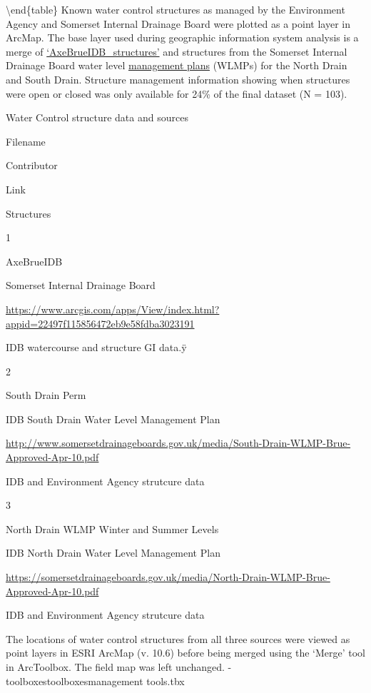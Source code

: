\documentclass[]{article}
\begin{document}
\textbackslash{}end\{table\} Known water control structures as managed
by the Environment Agency and Somerset Internal Drainage Board were
plotted as a point layer in ArcMap. The base layer used during
geographic information system analysis is a merge of
\href{https://www.arcgis.com/apps/View/index.html?appid=22497f115856472eb9e58fdba3023191}{`AxeBrueIDB\_structures'}
and structures from the Somerset Internal Drainage Board water level
\href{http://somersetdrainageboards.gov.uk/environment/wlmps/}{management
plans} (WLMPs) for the North Drain and South Drain. Structure management
information showing when structures were open or closed was only
available for 24\% of the final dataset (N = 103).

Water Control structure data and sources

Filename

Contributor

Link

Structures

1

AxeBrueIDB

Somerset Internal Drainage Board

\url{https://www.arcgis.com/apps/View/index.html?appid=22497f115856472eb9e58fdba3023191}

IDB watercourse and structure GI data.ÿ

2

South Drain Perm

IDB South Drain Water Level Management Plan

\url{http://www.somersetdrainageboards.gov.uk/media/South-Drain-WLMP-Brue-Approved-Apr-10.pdf}

IDB and Environment Agency strutcure data

3

North Drain WLMP Winter and Summer Levels

IDB North Drain Water Level Management Plan

\url{https://somersetdrainageboards.gov.uk/media/North-Drain-WLMP-Brue-Approved-Apr-10.pdf}

IDB and Environment Agency strutcure data

The locations of water control structures from all three sources were
viewed as point layers in ESRI ArcMap (v. 10.6) before being merged
using the `Merge' tool in ArcToolbox. The field map was left unchanged.
- toolboxes\system toolboxes\data management tools.tbx\general\merge
\end{document}
